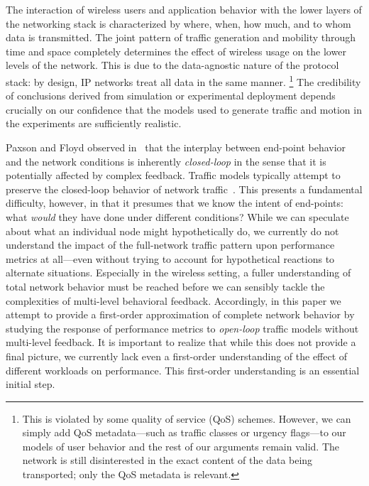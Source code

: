 \documentclass[conference]{IEEEtran}
\newcommand{\caps}[1]{{\small{#1}}}
\begin{document}
The interaction of wireless users and application behavior with the lower layers of the networking stack is characterized by where, when, how much, and to whom data is transmitted. The joint pattern of traffic generation and mobility through time and space completely determines the effect of wireless usage on the lower levels of the network. This is due to the data-agnostic nature of the protocol stack: by design, \caps{IP} networks treat all data in the same manner.%
\footnote{This is violated by some quality of service (QoS) schemes. However, we can simply add QoS metadata---such as traffic classes or urgency flags---to our models of user behavior and the rest of our arguments remain valid. The network is still disinterested in the exact content of the data being transported; only the QoS metadata is relevant.} The credibility of conclusions derived from simulation or experimental deployment depends crucially on our confidence that the models used to generate traffic and motion in the experiments are sufficiently realistic.

Paxson and Floyd observed in~\cite{Paxson95} that the interplay between end-point behavior and the network conditions is inherently \textit{closed-loop} in the sense that it is potentially affected by complex feedback. Traffic models typically attempt to preserve the closed-loop behavior of network traffic~\cite{Avallone04,Hernandez06}. This presents a fundamental difficulty, however, in that it presumes that we know the intent of end-points: what \textit{would} they have done under different conditions? While we can speculate about what an individual node might hypothetically do, we currently do not understand the impact of the full-network traffic pattern upon performance metrics at all---even without trying to account for hypothetical reactions to alternate situations. Especially in the wireless setting, a fuller understanding of total network behavior must be reached before we can sensibly tackle the complexities of multi-level behavioral feedback. Accordingly, in this paper we attempt to provide a first-order approximation of complete network behavior by studying the response of performance metrics to \textit{open-loop} traffic models without multi-level feedback. It is important to realize that while this does not provide a final picture, we currently lack even a first-order understanding of the effect of different workloads on performance. This first-order understanding is an essential initial step.
\end{document}
